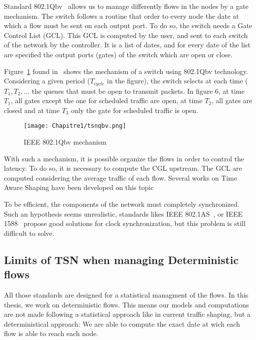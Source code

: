 Standard 802.1Qbv~\cite{8613095} allows us to manage differently flows in the nodes by a gate mechanism. The switch follows a routine that order to every node the date at which a flow must be sent on each output port. To do so, the switch needs a Gate Control List (GCL). This GCL is computed by the user, and sent to each switch of the network by the controller. It is a list of dates, and for every date of the list are specified the output ports (gates) of the switch which are open or close.


Figure~\ref{fig:tsnqbv} found in~\cite{durr2016no} shows the mechanism of a switch using 802.1Qbv technology. Considering a given period ($T_{cycle}$ in the figure), the switch selects at each time ($T_1 , T_2 , \ldots$ the queues that must be open to transmit packets. In figure 6, at time $T_1$, all gates except the one for scheduled traffic are open, at time $T_2$, all gates are closed and at time $T_3$ only the gate for scheduled traffic is open.

  \begin{figure}
  \begin{center}
  \texttt{[image: Chapitre1/tsnqbv.png]}
  \end{center}
  \caption{IEEE 802.1Qbv mechanism}\label{fig:tsnqbv}
  \end{figure}
      
With such a mechanism, it is possible organize the flows in order to control the latency. To do so, it is necessary to compute the CGL upstream. The GCL are computed considering the average traffic of each flow. Several works on Time Aware Shaping have been developed on this topic 

To be efficient, the components of the network must completely synchronized. Such an hypothesis seems unrealistic, standards likes IEEE 802.1AS~\cite{5741898}, or IEEE 1588~\cite{4579760} propose good solutions for clock synchronization, but this problem is still difficult to solve. 

\subsection{Limits of TSN when managing Deterministic flows}

All those standards are designed for a statistical managment of the flows. In this thesis, we work on deterministic flows. This means our models and computations are not made following a statistical approach like in current traffic shaping, but a deterministical approach: We are able to compute the exact date at wich each flow is able to reach each node. 

